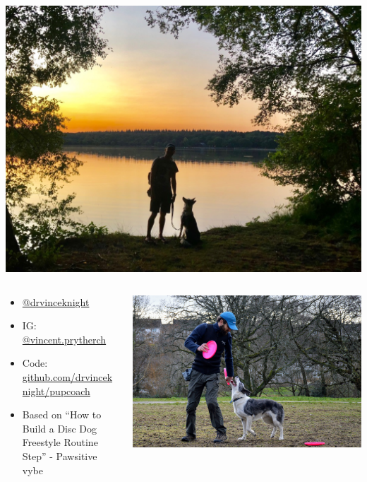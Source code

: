 \documentclass{beamer}
\begin{document}
    \begin{frame}
        \centering
        
        \includegraphics[width=.95\textwidth]{static/riggs_and_i_sunset.jpg}

    \end{frame}


    \begin{frame}
        \begin{columns}
            \begin{column}{.5\textwidth}
                \begin{itemize}
                    \item \url{@drvinceknight}
                    \item IG: \url{@vincent.prytherch}
                    \item Code: \url{github.com/drvinceknight/pupcoach}
                    \item Based on ``How to Build a Disc Dog Freestyle Routine
                    Step'' - Pawsitive vybe
                \end{itemize}
            \end{column}
            \begin{column}{.5\textwidth}
                \centering
                \includegraphics[width=\textwidth]{static/riggs_eyes_on_me.jpg}
            \end{column}
        \end{columns}
    \end{frame}
\end{document}
